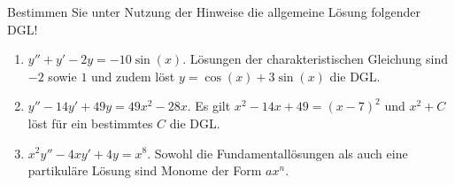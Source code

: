 \item Bestimmen Sie unter Nutzung der Hinweise die allgemeine Lösung folgender DGL!
\begin{enumerate}
	\item $y''+y'-2y=-10\sin(x)$. Lösungen der charakteristischen Gleichung sind $-2$ sowie $1$ und zudem löst $y=\cos(x)+3\sin(x)$ die DGL.
	\item $y''-14y'+49y=49x^2-28x$. Es gilt $x^2-14x+49=(x-7)^2$ und $x^2+C$ löst für ein bestimmtes $C$ die DGL.
	\item $x^2 y'' - 4xy'+4y=x^8$. Sowohl die Fundamentallösungen als auch eine partikuläre Lösung sind Monome der Form $ax^n$.
\end{enumerate}

